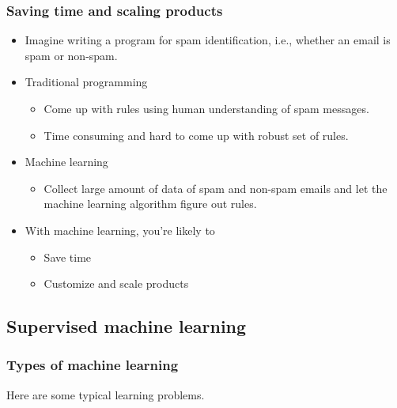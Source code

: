 \documentclass[11pt]{article}
\providecommand{\tightlist}{%
      \setlength{\itemsep}{0pt}\setlength{\parskip}{0pt}}
\begin{document}
    \subsubsection{Saving time and scaling
products}\label{saving-time-and-scaling-products}

\begin{itemize}
\tightlist
\item
  Imagine writing a program for spam identification, i.e., whether an
  email is spam or non-spam.
\item
  Traditional programming

  \begin{itemize}
  \tightlist
  \item
    Come up with rules using human understanding of spam messages.
  \item
    Time consuming and hard to come up with robust set of rules.
  \end{itemize}
\item
  Machine learning

  \begin{itemize}
  \tightlist
  \item
    Collect large amount of data of spam and non-spam emails and let the
    machine learning algorithm figure out rules.
  \end{itemize}
\item
  With machine learning, you're likely to

  \begin{itemize}
  \tightlist
  \item
    Save time
  \item
    Customize and scale products
  \end{itemize}
\end{itemize}

    

    \subsection{Supervised machine
learning}\label{supervised-machine-learning}

    \subsubsection{Types of machine
learning}\label{types-of-machine-learning}

Here are some typical learning problems.
\end{document}
